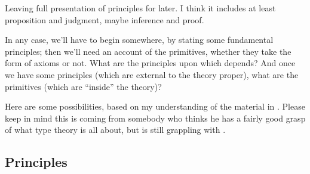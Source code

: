 \begin{remark}
  Leaving full presentation of principles for later.  I think it
  includes at least proposition and judgment, maybe inference and
  proof.
\end{remark}

In any case, we'll have to begin somewhere, by stating some
fundamental principles; then we'll need an account of the primitives,
whether they take the form of axioms or not.  What are the principles
upon which \HoTT depends?  And once we have some principles (which are
external to the theory proper), what are the primitives (which are
``inside'' the theory)?

Here are some possibilities, based on my understanding of the material
in \HoTTB.  Please keep in mind this is coming from somebody who
thinks he has a fairly good grasp of what type theory is all about,
but is still grappling with \HoTT.

\subsection{\HoTT Principles}
\label{subs:hottprinciples}

